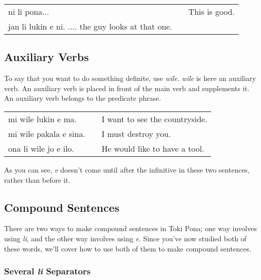 \begin{supertabular}{p{5,5cm}|ll}
ni li pona... && This is good. \\
jan li lukin e ni. .... the guy looks at that one. \\
\end{supertabular}


%
{}
\subsection*{Auxiliary Verbs}
%
To say that you want to do something definite, use \textit{wile}.
\textit{wile} is here an auxiliary verb. 
An auxiliary verb is placed in front of the main verb and supplements it. 
An auxiliary verb belongs to the predicate phrase. 

\begin{supertabular}{p{5,5cm}|ll}
mi wile lukin e ma. && I want to see the countryside. \\
mi wile pakala e sina. && I must destroy you. \\
ona li wile jo e ilo. && He would like to have a tool. \\
\end{supertabular} 

As you can see, \textit{e} doesn't come until after the infinitive in these two sentences, rather than before it. 

{}
\label{'multiple_li'}
\subsection*{Compound Sentences}
%
There are two ways to make compound sentences in Toki Pona; one way involves using \textit{li}, and the other way involves using \textit{e}. 
Since you've now studied both of these words, we'll cover how to use both of them to make compound sentences. 

\subsubsection*{Several \textit{li} Separators}
%


